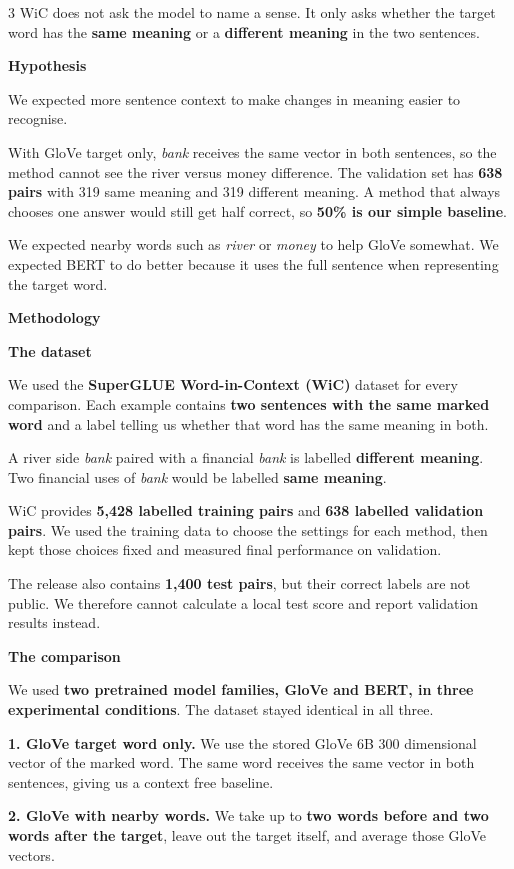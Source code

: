 \documentclass{article}
\newcommand{\sectiontitle}[1]{%
  \Needspace{4\baselineskip}%
  \par\vspace{5mm}%
  {\fontsize{30}{35}\selectfont\bfseries\textcolor{trierblue}{#1}\par}%
  \vspace{6mm}%
}
\newcommand{\subsectiontitle}[1]{%
  \Needspace{3\baselineskip}%
  \par\vspace{4mm}%
  {\fontsize{25}{29}\selectfont\bfseries\textcolor{deepblue}{#1}\par}%
  \vspace{4mm}%
}
\begin{document}
\begin{multicols}{3}
WiC does not ask the model to name a sense. It only asks whether the target word has the \textbf{same meaning} or a \textbf{different meaning} in the two sentences.

\columnbreak
\sectiontitle{Hypothesis}
We expected more sentence context to make changes in meaning easier to recognise.

With GloVe target only, \textit{bank} receives the same vector in both sentences, so the method cannot see the river versus money difference. The validation set has \textbf{638 pairs} with 319 same meaning and 319 different meaning. A method that always chooses one answer would still get half correct, so \textbf{50\% is our simple baseline}.

We expected nearby words such as \textit{river} or \textit{money} to help GloVe somewhat. We expected BERT to do better because it uses the full sentence when representing the target word.

\sectiontitle{Methodology}

\subsectiontitle{The dataset}
We used the \textbf{SuperGLUE Word-in-Context (WiC)} dataset for every comparison. Each example contains \textbf{two sentences with the same marked word} and a label telling us whether that word has the same meaning in both.

A river side \textit{bank} paired with a financial \textit{bank} is labelled \textbf{different meaning}. Two financial uses of \textit{bank} would be labelled \textbf{same meaning}.

WiC provides \textbf{5,428 labelled training pairs} and \textbf{638 labelled validation pairs}. We used the training data to choose the settings for each method, then kept those choices fixed and measured final performance on validation.

The release also contains \textbf{1,400 test pairs}, but their correct labels are not public. We therefore cannot calculate a local test score and report validation results instead.

\subsectiontitle{The comparison}
We used \textbf{two pretrained model families, GloVe and BERT, in three experimental conditions}. The dataset stayed identical in all three.

\textbf{1. GloVe target word only.} We use the stored GloVe 6B 300 dimensional vector of the marked word. The same word receives the same vector in both sentences, giving us a context free baseline.

\textbf{2. GloVe with nearby words.} We take up to \textbf{two words before and two words after the target}, leave out the target itself, and average those GloVe vectors.


\end{multicols}
\end{document}
